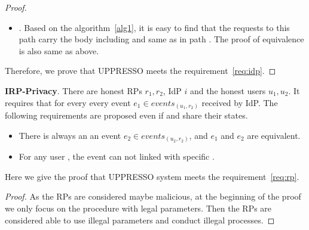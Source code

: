\begin{appendices}
\begin{proof}
\begin{itemize}
\item {}. Based on the algorithm~\ref{alg1}, it is easy to find that the requests to this path carry the body including  and  same as in path . The proof of equivalence is also same as above.
\end{itemize}
Therefore, we prove that UPPRESSO meets the requirement~\ref{req:idp}.
\end{proof}

\begin{req}
\textbf{IRP-Privacy}. There are honest RPs $r_1, r_2$, IdP $i$ and the honest users $u_1, u_2$. It requires that for every every event $e_1 \in events_{(u_1, r_2)}$ received by IdP. The following requirements are proposed even if  and  share their states.
\begin{itemize}
\item There is always an  an event $e_2 \in events_{(u_2, r_2)}$, and $e_1$ and $e_2$ are equivalent.
\item For any user , the event  can not linked with specific  .
\end{itemize}
\label{req:rp}
\end{req}
Here we give the proof that UPPRESSO system meets the requirement~\ref{req:rp}.
\begin{proof}
As the RPs are considered maybe malicious, at the beginning of the proof we only focus on the procedure with legal parameters. Then the RPs are considered able to use illegal parameters and conduct illegal processes. 


\end{proof}
\end{appendices}
